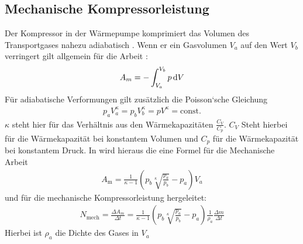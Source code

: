  \subsection{Mechanische Kompressorleistung}

Der Kompressor in der Wärmepumpe komprimiert das Volumen des Transportgases nahezu adiabatisch \cite[vgl.][]{man:v206}.
Wenn er ein Gasvolumen $V_a$ auf den Wert $V_b$ verringert gilt allgemein für die Arbeit \cite[vgl.][]{man:v206}:
\begin{align}
    A_m = - \int_{V_a}^{V_b} p \mathop{}\!\mathrm{d} V
\end{align}
Für adiabatische Verformungen gilt zusätzlich die Poisson`sche Gleichung
\begin{align}
    p_a V_{a}^{\kappa} = p_{b} V_{b}^{\kappa} = p V^{\kappa} = \mathrm{const.}
\end{align}
$\kappa$ steht hier für das Verhältnis aus den Wärmekapazitäten $\frac{C_V}{C_p}$.
$C_V$ Steht hierbei für die Wärmekapazität bei konstantem Volumen und $C_p$ für die Wärmekapazität bei konstantem Druck.
In \cite{man:v206} wird hieraus die eine Formel für die Mechanische Arbeit
\begin{align}
    A_{\text{m}} = \frac{1}{\kappa - 1} \left( p_b \sqrt[\kappa]{\frac{p_a}{p_b}} -p_a \right) V_a
\end{align}
und für die mechanische Kompressorleistung hergeleitet:
\begin{align}
    N_{\text{mech}} = \frac{\Delta A_m}{\Delta t} = \frac{1}{\kappa - 1}%
     \left(p_b \sqrt[\kappa]{\frac{p_a}{p_b}} - p_a \right) \frac{1}{\rho_{a}}\frac{\Delta m}{\Delta t}
\end{align}
Hierbei ist $\rho_a$ die Dichte des Gases in $V_a$